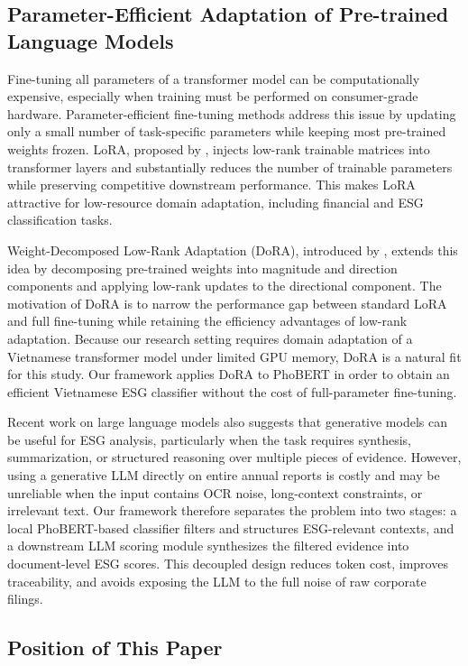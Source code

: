 \documentclass{article}
\theoremstyle{plain}
\theoremstyle{definition}
\theoremstyle{remark}
\begin{document}
\subsection{Parameter-Efficient Adaptation of Pre-trained Language Models}

Fine-tuning all parameters of a transformer model can be computationally expensive, especially when training must be performed on consumer-grade hardware. 
Parameter-efficient fine-tuning methods address this issue by updating only a small number of task-specific parameters while keeping most pre-trained weights frozen. 
LoRA, proposed by \citet{hu2022lora}, injects low-rank trainable matrices into transformer layers and substantially reduces the number of trainable parameters while preserving competitive downstream performance. 
This makes LoRA attractive for low-resource domain adaptation, including financial and ESG classification tasks.

Weight-Decomposed Low-Rank Adaptation (DoRA), introduced by \citet{liu2024dora}, extends this idea by decomposing pre-trained weights into magnitude and direction components and applying low-rank updates to the directional component. 
The motivation of DoRA is to narrow the performance gap between standard LoRA and full fine-tuning while retaining the efficiency advantages of low-rank adaptation. 
Because our research setting requires domain adaptation of a Vietnamese transformer model under limited GPU memory, DoRA is a natural fit for this study. 
Our framework applies DoRA to PhoBERT in order to obtain an efficient Vietnamese ESG classifier without the cost of full-parameter fine-tuning.

Recent work on large language models also suggests that generative models can be useful for ESG analysis, particularly when the task requires synthesis, summarization, or structured reasoning over multiple pieces of evidence. 
However, using a generative LLM directly on entire annual reports is costly and may be unreliable when the input contains OCR noise, long-context constraints, or irrelevant text. 
Our framework therefore separates the problem into two stages: a local PhoBERT-based classifier filters and structures ESG-relevant contexts, and a downstream LLM scoring module synthesizes the filtered evidence into document-level ESG scores. 
This decoupled design reduces token cost, improves traceability, and avoids exposing the LLM to the full noise of raw corporate filings.

\subsection{Position of This Paper}
\end{document}
